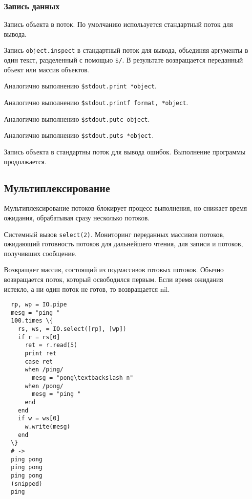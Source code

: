 \subsubsection*{Запись данных}

\begin{methodlist}
  Запись объекта в поток. По умолчанию используется стандартный поток для вывода.

  Запись \verb!object.inspect! в стандартный поток для вывода, объединяя аргументы в один текст, разделенный с помощью \verb!$/!. В результате возвращается переданный объект или массив объектов.
 
  Аналогично выполнению \verb!$stdout.print *object!. 

  Аналогично выполнению \verb!$stdout.printf format, *object!.
 
  Аналогично выполнению \verb!$stdout.putc object!.
 
  Аналогично выполнению \verb!$stdout.puts *object!.
 
  Запись объекта в стандартны поток для вывода ошибок. Выполнение программы продолжается.
\end{methodlist}

\subsection{Мультиплексирование}

Мультиплексирование потоков блокирует процесс выполнения, но снижает время ожидания, обрабатывая сразу несколько потоков.

\begin{methodlist}
  Системный вызов \verb!select(2)!. Мониторинг переданных массивов потоков, ожидающий готовность потоков для дальнейшего чтения, для записи и потоков, получивших сообщение.

  Возвращает массив, состоящий из подмассивов готовых потоков. Обычно возвращается поток, который освободился первым. Если время ожидания истекло, а ни один поток не готов, то возвращается nil.
  \begin{verbatim}
  rp, wp = IO.pipe
  mesg = "ping "
  100.times \{
    rs, ws, = IO.select([rp], [wp])
    if r = rs[0]
      ret = r.read(5)
      print ret
      case ret
      when /ping/
        mesg = "pong\textbackslash n"
      when /pong/
        mesg = "ping "
      end
    end
    if w = ws[0]
      w.write(mesg)
    end
  \}
  # ->
  ping pong
  ping pong
  ping pong
  (snipped)
  ping
  \end{verbatim}
\end{methodlist}
 
